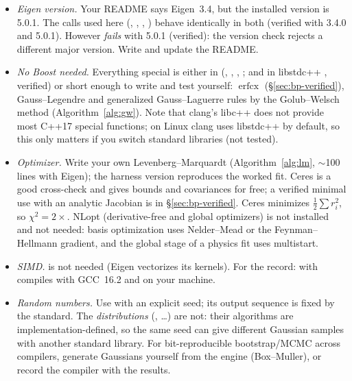 \documentclass[11pt,a4paper]{article}
\numberwithin{equation}{section}
\theoremstyle{definition}
\theoremstyle{plain}
\theoremstyle{remark}
\numberwithin{algorithm}{section}
\newcommand{\erfcx}{\operatorname{erfcx}}
\begin{document}
\begin{itemize}[leftmargin=1.3em,itemsep=2pt]
\item \emph{Eigen version.} Your README says Eigen~3.4, but the installed version is 5.0.1. The calls used here (, , , ) behave identically in both (verified with 3.4.0 and 5.0.1). However  \emph{fails} with 5.0.1 (verified): the version check rejects a different major version. Write  and update the README.
\item \emph{No Boost needed.} Everything special is either in  (, , , ; and in libstdc++ , verified) or short enough to write and test yourself: $\erfcx$ (\S\ref{sec:bp-verified}), Gauss--Legendre and generalized Gauss--Laguerre rules by the Golub--Welsch method (Algorithm~\ref{alg:gw}). Note that clang's libc++ does not provide most C++17 special functions; on Linux clang uses libstdc++ by default, so this only matters if you switch standard libraries (not tested).
\item \emph{Optimizer.} Write your own Levenberg--Marquardt (Algorithm~\ref{alg:lm}, $\sim$100 lines with Eigen); the harness version reproduces the worked fit. Ceres is a good cross-check and gives bounds and covariances for free; a verified minimal use with an analytic Jacobian is in \S\ref{sec:bp-verified}. Ceres minimizes $\frac12\sum r_i^2$, so $\chi^2=2\times$. NLopt (derivative-free and global optimizers) is not installed and not needed: basis optimization uses Nelder--Mead or the Feynman--Hellmann gradient, and the global stage of a physics fit uses multistart.
\item \emph{SIMD.}  is not needed (Eigen vectorizes its kernels). For the record:  with  compiles with GCC~16.2 and  on your machine.
\item \emph{Random numbers.} Use  with an explicit seed; its output sequence is fixed by the standard. The \emph{distributions} (, \dots) are not: their algorithms are implementation-defined, so the same seed can give different Gaussian samples with another standard library. For bit-reproducible bootstrap/MCMC across compilers, generate Gaussians yourself from the engine (Box--Muller), or record the compiler with the results.
\end{itemize}
\end{document}
